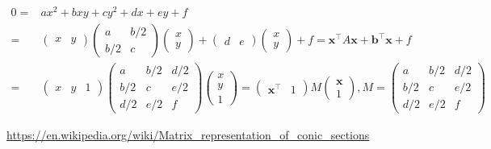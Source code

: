 \documentclass[
]{book}
\theoremstyle{definition}
\theoremstyle{definition}
\theoremstyle{definition}
\theoremstyle{definition}
\theoremstyle{remark}
\begin{document}
\[
\begin{aligned}
0= & ax^{2}+bxy+cy^{2}+dx+ey+f\\
= & \begin{pmatrix}x & y\end{pmatrix}\begin{pmatrix}a & b/2\\
b/2 & c
\end{pmatrix}\begin{pmatrix}x\\
y
\end{pmatrix}+\begin{pmatrix}d & e\end{pmatrix}\begin{pmatrix}x\\
y
\end{pmatrix}+f=\boldsymbol{x}^{\intercal}A\boldsymbol{x}+\boldsymbol{b}^{\intercal}\boldsymbol{x}+f\\
= & \begin{pmatrix}x & y & 1\end{pmatrix}\begin{pmatrix}a & b/2 & d/2\\
b/2 & c & e/2\\
d/2 & e/2 & f
\end{pmatrix}\begin{pmatrix}x\\
y\\
1
\end{pmatrix}=\begin{pmatrix}\boldsymbol{x}^{\intercal} & 1\end{pmatrix}M\begin{pmatrix}\boldsymbol{x}\\
1
\end{pmatrix},M=\begin{pmatrix}a & b/2 & d/2\\
b/2 & c & e/2\\
d/2 & e/2 & f
\end{pmatrix}
\end{aligned}
\]

\url{https://en.wikipedia.org/wiki/Matrix_representation_of_conic_sections}
\end{document}
